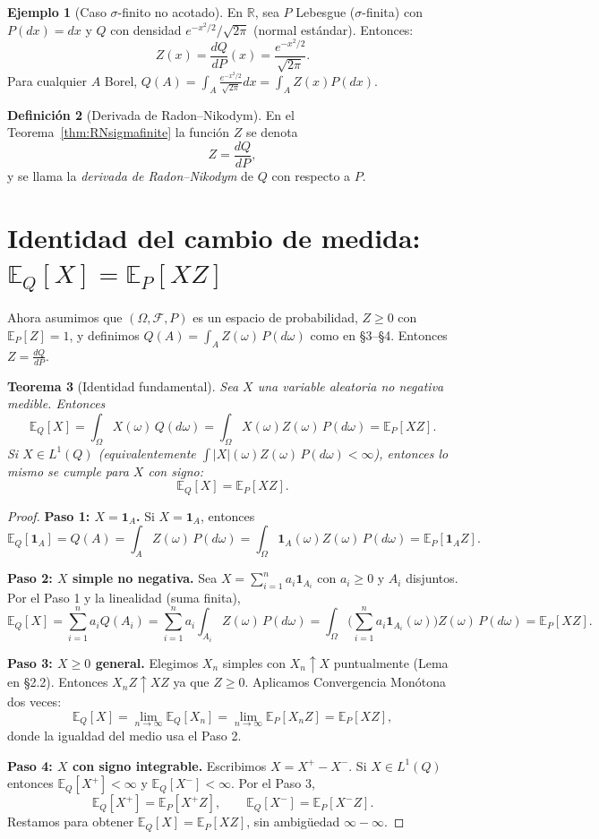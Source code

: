 \documentclass[11pt,a4paper]{article}
\theoremstyle{plain}
\newtheorem{theorem}{Teorema}[section]
\theoremstyle{definition}
\newtheorem{definition}[theorem]{Definición}
\newtheorem{example}[theorem]{Ejemplo}
\theoremstyle{remark}
\newcommand{\1}{\mathbf{1}}
\newcommand{\RR}{\mathbb{R}}
\newcommand{\cF}{\mathcal{F}}
\newcommand{\EE}{\mathbb{E}}
\newcommand{\abs}[1]{\left\lvert #1\right\rvert}
\begin{document}
\begin{example}[Caso $\sigma$-finito no acotado]
En $\RR$, sea $P$ Lebesgue ($\sigma$-finita) con $P(dx)=dx$ y $Q$ con densidad $e^{-x^2/2}/\sqrt{2\pi}$ (normal estándar). Entonces:
\[
Z(x)=\frac{dQ}{dP}(x) = \frac{e^{-x^2/2}}{\sqrt{2\pi}}.
\]
Para cualquier $A$ Borel, $Q(A)=\int_A \frac{e^{-x^2/2}}{\sqrt{2\pi}} dx = \int_A Z(x) P(dx)$.
\end{example}

\begin{definition}[Derivada de Radon--Nikodym]
En el Teorema~\ref{thm:RNsigmafinite} la función $Z$ se denota
\[
Z=\frac{dQ}{dP},
\]
y se llama la \emph{derivada de Radon--Nikodym} de $Q$ con respecto a $P$.
\end{definition}

\section{Identidad del cambio de medida: \texorpdfstring{$\EE_Q[X]=\EE_P[XZ]$}{EQ[X]=EP[XZ]}}

Ahora asumimos que $(\Omega,\cF,P)$ es un espacio de probabilidad, $Z\ge0$ con $\EE_P[Z]=1$, y definimos $Q(A)=\int_A Z(\omega)\,P(d\omega)$ como en \S3--\S4. Entonces $Z=\frac{dQ}{dP}$.

\begin{theorem}[Identidad fundamental]
\label{thm:changeofmeasure}
Sea $X$ una variable aleatoria no negativa medible. Entonces
\[
\EE_Q[X] = \int_\Omega X(\omega)\,Q(d\omega) = \int_\Omega X(\omega)Z(\omega)\,P(d\omega) = \EE_P[XZ].
\]
Si $X\in L^1(Q)$ (equivalentemente $\int \abs{X}(\omega)Z(\omega)\,P(d\omega)<\infty$), entonces lo mismo se cumple para $X$ con signo:
\[
\EE_Q[X]=\EE_P[XZ].
\]
\end{theorem}

\begin{proof}
\textbf{Paso 1: $X=\1_A$.} Si $X=\1_A$, entonces
\[
\EE_Q[\1_A]=Q(A)=\int_A Z(\omega)\,P(d\omega)=\int_\Omega \1_A(\omega) Z(\omega)\,P(d\omega) = \EE_P[\1_A Z].
\]

\smallskip
\noindent\textbf{Paso 2: $X$ simple no negativa.}
Sea $X=\sum_{i=1}^n a_i\1_{A_i}$ con $a_i\ge0$ y $A_i$ disjuntos. Por el Paso 1 y la linealidad (suma finita),
\[
\EE_Q[X]=\sum_{i=1}^n a_i Q(A_i)
=\sum_{i=1}^n a_i\int_{A_i} Z(\omega)\,P(d\omega)
=\int_\Omega \Big(\sum_{i=1}^n a_i\1_{A_i}(\omega)\Big) Z(\omega)\,P(d\omega)
=\EE_P[XZ].
\]

\smallskip
\noindent\textbf{Paso 3: $X\ge0$ general.}
Elegimos $X_n$ simples con $X_n\uparrow X$ puntualmente (Lema en \S2.2). Entonces $X_n Z\uparrow XZ$ ya que $Z\ge0$.
Aplicamos Convergencia Monótona dos veces:
\[
\EE_Q[X]=\lim_{n\to\infty}\EE_Q[X_n]
=\lim_{n\to\infty}\EE_P[X_n Z]
=\EE_P[XZ],
\]
donde la igualdad del medio usa el Paso 2.

\smallskip
\noindent\textbf{Paso 4: $X$ con signo integrable.}
Escribimos $X=X^+-X^-$. Si $X\in L^1(Q)$ entonces $\EE_Q[X^+]<\infty$ y $\EE_Q[X^-]<\infty$.
Por el Paso 3,
\[
\EE_Q[X^+] = \EE_P[X^+ Z],\qquad \EE_Q[X^-]=\EE_P[X^- Z].
\]
Restamos para obtener $\EE_Q[X]=\EE_P[XZ]$, sin ambigüedad $\infty-\infty$.
\end{proof}
\end{document}
